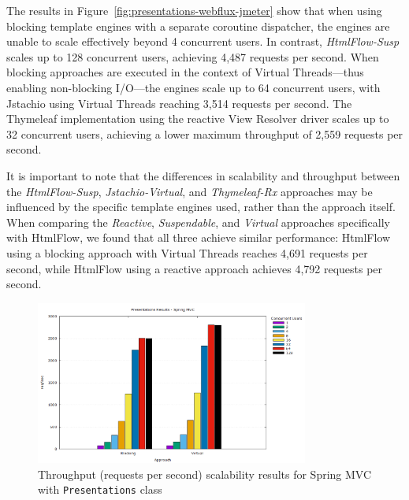 The results in Figure~\ref{fig:presentations-webflux-jmeter} show that when
using blocking template engines with a separate coroutine dispatcher, the
engines are unable to scale effectively beyond 4 concurrent users. In contrast,
\textit{HtmlFlow-Susp} scales up to 128 concurrent users, achieving 4,487
requests per second. When blocking approaches are executed in the context of
Virtual Threads—thus enabling non-blocking I/O—the engines scale up to 64
concurrent users, with Jstachio using Virtual Threads reaching 3,514 requests
per second. The Thymeleaf implementation using the reactive View Resolver
driver scales up to 32 concurrent users, achieving a lower maximum throughput
of 2,559 requests per second.

It is important to note that the differences in scalability and throughput
between the \textit{HtmlFlow-Susp}, \textit{Jstachio-Virtual}, and
\textit{Thymeleaf-Rx} approaches may be influenced by the specific template
engines used, rather than the approach itself. When comparing the
\textit{Reactive}, \textit{Suspendable}, and \textit{Virtual} approaches
specifically with HtmlFlow, we found that all three achieve similar
performance: HtmlFlow using a blocking approach with Virtual Threads reaches
4,691 requests per second, while HtmlFlow using a reactive approach achieves
4,792 requests per second.

\begin{figure}[h]
     \centering
     \includegraphics[width=0.8\textwidth]{./Graphs/presentations-springmvc-jmeter.png}
     \caption{Throughput (requests per second) scalability results for Spring MVC with \texttt{Presentations} class}\label{fig:presentations-springmvc-jmeter}
\end{figure}

